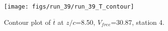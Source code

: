 \begin{figure}[H]
\centering
\texttt{[image: figs/run\_39/run\_39\_T\_contour]}
\caption{Contour plot of $\overline{t}$ at $z/c$=8.50, $V_{free}$=30.87, station 4.}
\label{fig:run_39_T_contour}
\end{figure}


